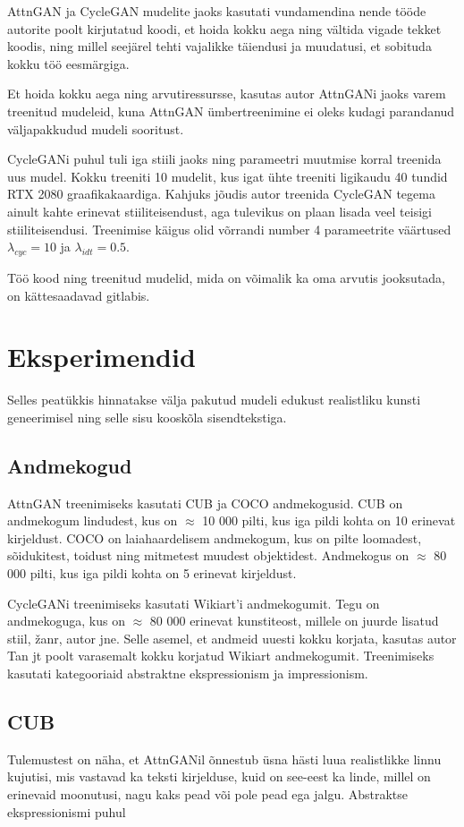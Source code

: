 \documentclass{vilgym}
\begin{document}
	AttnGAN ja CycleGAN mudelite jaoks kasutati vundamendina nende tööde autorite poolt kirjutatud koodi, et hoida kokku aega ning vältida vigade tekket koodis, ning millel seejärel tehti vajalikke täiendusi ja muudatusi, et sobituda kokku töö eesmärgiga.

	Et hoida kokku aega ning arvutiressursse, kasutas autor AttnGANi jaoks varem treenitud mudeleid, kuna AttnGAN ümbertreenimine ei oleks kudagi parandanud väljapakkudud mudeli sooritust.

	CycleGANi puhul tuli iga stiili jaoks ning parameetri muutmise korral treenida uus mudel. Kokku treeniti 10  mudelit, kus igat ühte treeniti ligikaudu 40 tundid RTX 2080 graafikakaardiga. Kahjuks jõudis autor treenida CycleGAN tegema ainult kahte erinevat stiiliteisendust, aga tulevikus on plaan lisada veel teisigi stiiliteisendusi. Treenimise käigus olid võrrandi number 4 parameetrite väärtused $ \lambda_{cyc} = 10 $ ja $ \lambda_{idt} = 0.5 $.

	Töö kood ning treenitud mudelid, mida on võimalik ka oma arvutis jooksutada, on kättesaadavad gitlabis.

	\section{Eksperimendid}
	Selles peatükkis hinnatakse välja pakutud mudeli edukust realistliku kunsti geneerimisel ning selle sisu kooskõla sisendtekstiga.

	\subsection{Andmekogud}
	AttnGAN treenimiseks kasutati CUB\parencite{cub} ja COCO\parencite{srgan} andmekogusid. CUB on andmekogum lindudest, kus on $\approx$ 10 000 pilti, kus iga pildi kohta on 10 erinevat kirjeldust. COCO on laiahaardelisem andmekogum, kus on pilte loomadest, sõidukitest, toidust ning mitmetest muudest objektidest. Andmekogus on $\approx$ 80 000 pilti, kus iga pildi kohta on 5 erinevat kirjeldust.

	CycleGANi treenimiseks kasutati Wikiart'i andmekogumit\parencite{wikiart}. Tegu on andmekoguga, kus on $\approx$ 80 000 erinevat kunstiteost, millele on juurde lisatud stiil, žanr, autor jne. Selle asemel, et andmeid uuesti kokku korjata, kasutas autor Tan jt poolt varasemalt kokku korjatud Wikiart andmekogumit\parencite{artgan}. Treenimiseks kasutati kategooriaid abstraktne ekspressionism ja impressionism.

	\subsection{CUB}
	Tulemustest on näha, et AttnGANil õnnestub üsna hästi luua realistlikke linnu kujutisi, mis vastavad ka teksti kirjelduse, kuid on see-eest ka linde, millel on erinevaid moonutusi, nagu kaks pead või pole pead ega jalgu. Abstraktse ekspressionismi puhul
\end{document}
